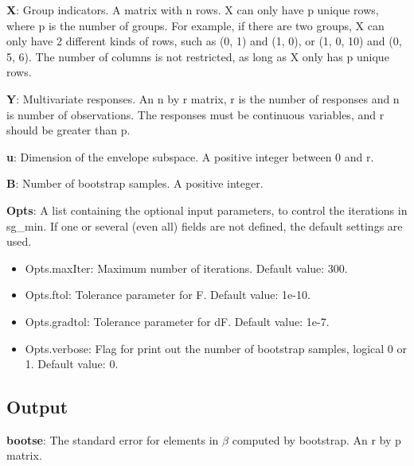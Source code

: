 \documentclass[a4paper,11pt,openany]{memoir}
\begin{document}
\begin{par}
\textbf{X}: Group indicators. A matrix with n rows.  X can only have p unique  rows, where p is the number of groups. For example, if there are two groups, X can only have 2 different kinds of rows, such as (0, 1) and (1, 0), or (1, 0, 10) and (0, 5, 6).  The number of columns is not restricted, as long as X only has p unique rows.
\end{par} \vspace{1em}
\begin{par}
\textbf{Y}: Multivariate responses. An n by r matrix, r is the number of responses and n is number of observations. The responses must be continuous variables, and r should be greater than p.
\end{par} \vspace{1em}
\begin{par}
\textbf{u}: Dimension of the envelope subspace.  A positive integer between 0 and r.
\end{par} \vspace{1em}
\begin{par}
\textbf{B}: Number of bootstrap samples.  A positive integer.
\end{par} \vspace{1em}
\begin{par}
\textbf{Opts}: A list containing the optional input parameters, to control the iterations in sg\_min. If one or several (even all) fields are not defined, the default settings are used.
\end{par} \vspace{1em}
\begin{itemize}
\setlength{\itemsep}{-1ex}
   \item Opts.maxIter: Maximum number of iterations.  Default value: 300.
   \item Opts.ftol: Tolerance parameter for F.  Default value: 1e-10.
   \item Opts.gradtol: Tolerance parameter for dF.  Default value: 1e-7.
   \item Opts.verbose: Flag for print out the number of bootstrap samples, logical 0 or 1. Default value: 0.
\end{itemize}


\subsection*{Output}

\begin{par}
\textbf{bootse}: The standard error for elements in $\beta$ computed by bootstrap.  An r by p matrix.
\end{par} \vspace{1em}
\end{document}
